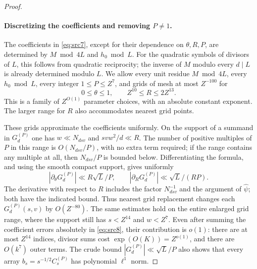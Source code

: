 \begin{proof}
\paragraph{Discretizing the coefficients and removing $P\ne1$.}
The coefficients in \eqref{eq:src7}, except for their dependence on
$\theta,R,P$, are determined by $M\bmod4L$ and $h_0\bmod L$.
For the quadratic symbols of divisors of $L$, this follows from
quadratic reciprocity; the inverse of $M$ modulo every $d\mid L$
is already determined modulo $L$.
We allow every unit residue $M\bmod4L$, every $h_0\bmod L$,
every integer $1\leq P\leq Z^7$, and grids of mesh at most
$Z^{-100}$ for
\[
 0\leq\theta\leq1,\qquad Z^{10}\leq R\leq2Z^{13}.
\]
This is a family of $Z^{O(1)}$ parameter choices, with an absolute
constant exponent.  The larger range for $R$ also accommodates
nearest grid points.

These grids approximate the coefficients uniformly.  On the support
of a summand in $G_d^{(P)}$ one has $w\ll N_{dsv}$ and
$svw^2/d\ll R$.  The number of positive multiples of $P$ in this
range is $O(N_{dsv}/P)$, with no extra term required; if the range
contains any multiple at all, then $N_{dsv}/P$ is bounded below.
Differentiating the formula, and using the smooth compact support,
gives uniformly
\[
 |\partial_\theta G_d^{(P)}|\ll R\sqrt L/P,\qquad
 |\partial_R G_d^{(P)}|\ll \sqrt L/(RP).
\]
The derivative with respect to $R$ includes the factor $N_{dsv}^{-1}$
and the argument of $\widehat\psi$; both have the indicated bound.
Thus nearest grid replacement changes each $G_d^{(P)}(s,v)$ by
$O(Z^{-80})$.  The same estimates hold on the entire enlarged grid
range, where the support still has $s<Z^{14}$ and $w<Z^7$.
Even after summing the coefficient errors absolutely in
\eqref{eq:src8}, their contribution is $o(1)$: there are at most
$Z^{14}$ indices, divisor sums cost $\exp(O(K))=Z^{o(1)}$, and
there are $O(k^7)$ outer terms.
The crude bound $|G_d^{(P)}|\ll\sqrt L/P$ also shows that every
array $b_s=s^{-1/2}C_s^{(P)}$ has polynomial $\ell^1$ norm.


\end{proof}
